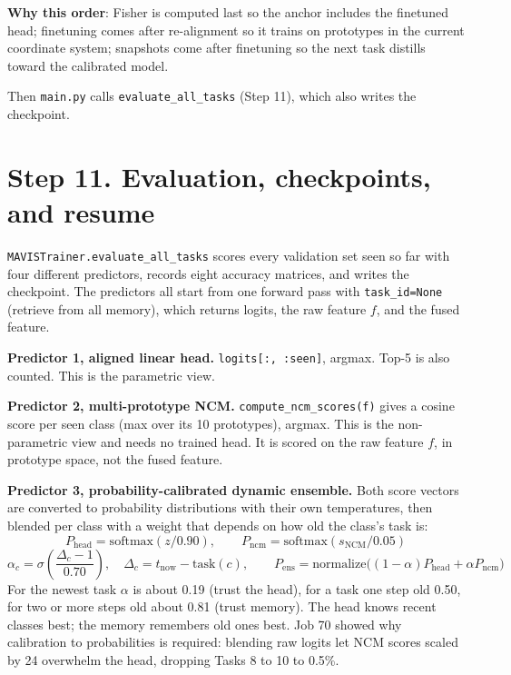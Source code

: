 \documentclass[11pt,a4paper]{article}
\newcommand{\code}[1]{\texttt{#1}}
\begin{document}
\textbf{Why this order}: Fisher is computed last so the anchor includes the finetuned head; finetuning comes after re-alignment so it trains on prototypes in the current coordinate system; snapshots come after finetuning so the next task distills toward the calibrated model.

Then \code{main.py} calls \code{evaluate\_all\_tasks} (Step 11), which also writes the checkpoint.

\section{Step 11. Evaluation, checkpoints, and resume}

\code{MAVISTrainer.evaluate\_all\_tasks} scores every validation set seen so far with four different predictors, records eight accuracy matrices, and writes the checkpoint. The predictors all start from one forward pass with \code{task\_id=None} (retrieve from all memory), which returns logits, the raw feature $f$, and the fused feature.

\textbf{Predictor 1, aligned linear head.} \code{logits[:, :seen]}, argmax. Top-5 is also counted. This is the parametric view.

\textbf{Predictor 2, multi-prototype NCM.} \code{compute\_ncm\_scores(f)} gives a cosine score per seen class (max over its 10 prototypes), argmax. This is the non-parametric view and needs no trained head. It is scored on the raw feature $f$, in prototype space, not the fused feature.

\textbf{Predictor 3, probability-calibrated dynamic ensemble.} Both score vectors are converted to probability distributions with their own temperatures, then blended per class with a weight that depends on how old the class's task is:
\begin{equation}
P_{\mathrm{head}} = \mathrm{softmax}(z / 0.90), \qquad P_{\mathrm{ncm}} = \mathrm{softmax}(s_{\mathrm{NCM}} / 0.05)
\end{equation}
\begin{equation}
\alpha_c = \sigma\!\left(\frac{\Delta_c - 1}{0.70}\right), \quad \Delta_c = t_{\mathrm{now}} - \mathrm{task}(c), \qquad P_{\mathrm{ens}} = \mathrm{normalize}\big((1-\alpha) P_{\mathrm{head}} + \alpha P_{\mathrm{ncm}}\big)
\end{equation}
For the newest task $\alpha$ is about 0.19 (trust the head), for a task one step old 0.50, for two or more steps old about 0.81 (trust memory). The head knows recent classes best; the memory remembers old ones best. Job 70 showed why calibration to probabilities is required: blending raw logits let NCM scores scaled by 24 overwhelm the head, dropping Tasks 8 to 10 to 0.5\%.
\end{document}
